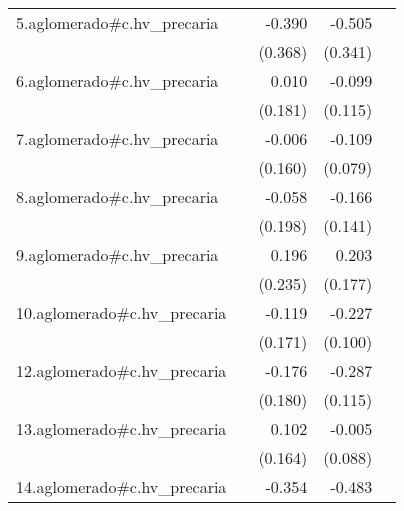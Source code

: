 {\begin{longtable}{l*{4}{D{.}{.}{-1}}}
\addlinespace
5.aglomerado#c.hv\_precaria&                     &      -0.390         &      -0.505         &                     \\
            &                     &     (0.368)         &     (0.341)         &                     \\
\addlinespace
6.aglomerado#c.hv\_precaria&                     &       0.010         &      -0.099         &                     \\
            &                     &     (0.181)         &     (0.115)         &                     \\
\addlinespace
7.aglomerado#c.hv\_precaria&                     &      -0.006         &      -0.109         &                     \\
            &                     &     (0.160)         &     (0.079)         &                     \\
\addlinespace
8.aglomerado#c.hv\_precaria&                     &      -0.058         &      -0.166         &                     \\
            &                     &     (0.198)         &     (0.141)         &                     \\
\addlinespace
9.aglomerado#c.hv\_precaria&                     &       0.196         &       0.203         &                     \\
            &                     &     (0.235)         &     (0.177)         &                     \\
\addlinespace
10.aglomerado#c.hv\_precaria&                     &      -0.119         &      -0.227\sym{*}  &                     \\
            &                     &     (0.171)         &     (0.100)         &                     \\
\addlinespace
12.aglomerado#c.hv\_precaria&                     &      -0.176         &      -0.287\sym{*}  &                     \\
            &                     &     (0.180)         &     (0.115)         &                     \\
\addlinespace
13.aglomerado#c.hv\_precaria&                     &       0.102         &      -0.005         &                     \\
            &                     &     (0.164)         &     (0.088)         &                     \\
\addlinespace
14.aglomerado#c.hv\_precaria&                     &      -0.354         &      -0.483\sym{*}  &                     \\

\end{longtable}}
